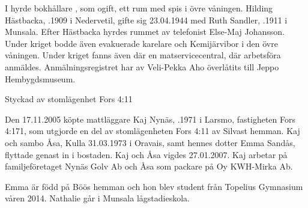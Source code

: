 I  hyrde bokhållare , som ogift, ett rum med spis i övre våningen. Hilding Hästbacka, .1909 i Nedervetil, gifte sig 23.04.1944 med Ruth Sandler, .1911 i Munsala. Efter Hästbacka hyrdes rummet av telefonist Else-Maj Johansson. Under kriget bodde även evakuerade karelare och Kemijärvibor i den övre våningen. Under kriget fanns även där en matservicecentral, där arbetsföra anmäldes. Anmälningsregistret har av Veli-Pekka Aho överlåtits till Jeppo Hembygdsmuseum.



%

Styckad av stomlägenhet Fors 4:11


%
Den 17.11.2005 köpte mattläggare Kaj Nynäs, .1971 i Larsmo, fastigheten Fors 4:171, som utgjorde en del av stomlägenheten Fors 4:11 av Silvast hemman.  Kaj och sambo Åsa, \textborn Kulla 31.03.1973 i Oravais, samt hennes dotter Emma Sandås, flyttade genast in i bostaden. Kaj och Åsa vigdes 27.01.2007. Kaj arbetar på familjeföretaget Nynäs Golv Ab och Åsa som packare på Oy KWH-Mirka Ab.
\begin{jhchildren}
  \item {}
  \item {}
  \item {}
\end{jhchildren}

Emma är född på Böös hemman och hon blev student från Topelius Gymnasium våren 2014. Nathalie går i Munsala lågstadieskola.


